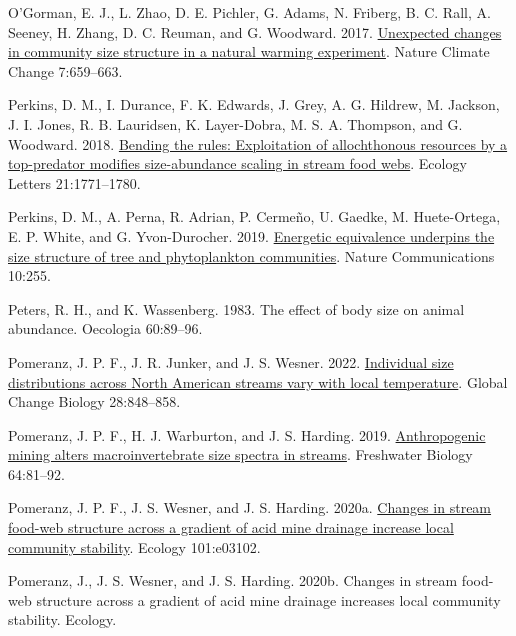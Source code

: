 \documentclass[
  12pt,
]{article}
\newlength{\cslhangindent}
\newlength{\cslentryspacingunit} %
\newenvironment{CSLReferences}[2] %
 {%
  \setlength{\parindent}{0pt}
  \ifodd #1
  \let\oldpar\par
  \def\par{\hangindent=\cslhangindent\oldpar}
  \fi
  \setlength{\parskip}{#2\cslentryspacingunit}
 }%
 {}
\numberwithin{equation}
\begin{document}
\begin{CSLReferences}{1}{0}
\leavevmode{}%
O'Gorman, E. J., L. Zhao, D. E. Pichler, G. Adams, N. Friberg, B. C.
Rall, A. Seeney, H. Zhang, D. C. Reuman, and G. Woodward. 2017.
\href{https://doi.org/10.1038/nclimate3368}{Unexpected changes in
community size structure in a natural warming experiment}. Nature
Climate Change 7:659--663.

\leavevmode{}%
Perkins, D. M., I. Durance, F. K. Edwards, J. Grey, A. G. Hildrew, M.
Jackson, J. I. Jones, R. B. Lauridsen, K. Layer-Dobra, M. S. A.
Thompson, and G. Woodward. 2018.
\href{https://doi.org/10.1111/ele.13147}{Bending the rules: Exploitation
of allochthonous resources by a top-predator modifies size-abundance
scaling in stream food webs}. Ecology Letters 21:1771--1780.

\leavevmode{}%
Perkins, D. M., A. Perna, R. Adrian, P. Cermeño, U. Gaedke, M.
Huete-Ortega, E. P. White, and G. Yvon-Durocher. 2019.
\href{https://doi.org/10.1038/s41467-018-08039-3}{Energetic equivalence
underpins the size structure of tree and phytoplankton communities}.
Nature Communications 10:255.

\leavevmode{}%
Peters, R. H., and K. Wassenberg. 1983. The effect of body size on
animal abundance. Oecologia 60:89--96.

\leavevmode{}%
Pomeranz, J. P. F., J. R. Junker, and J. S. Wesner. 2022.
\href{https://doi.org/10.1111/gcb.15862}{Individual size distributions
across {North American} streams vary with local temperature}. Global
Change Biology 28:848--858.

\leavevmode{}%
Pomeranz, J. P. F., H. J. Warburton, and J. S. Harding. 2019.
\href{https://doi.org/10.1111/fwb.13196}{Anthropogenic mining alters
macroinvertebrate size spectra in streams}. Freshwater Biology
64:81--92.

\leavevmode{}%
Pomeranz, J. P. F., J. S. Wesner, and J. S. Harding. 2020a.
\href{https://doi.org/10.1002/ecy.3102}{Changes in stream food-web
structure across a gradient of acid mine drainage increase local
community stability}. Ecology 101:e03102.

\leavevmode{}%
Pomeranz, J., J. S. Wesner, and J. S. Harding. 2020b. Changes in stream
food-web structure across a gradient of acid mine drainage increases
local community stability. Ecology.


\end{CSLReferences}
\end{document}
